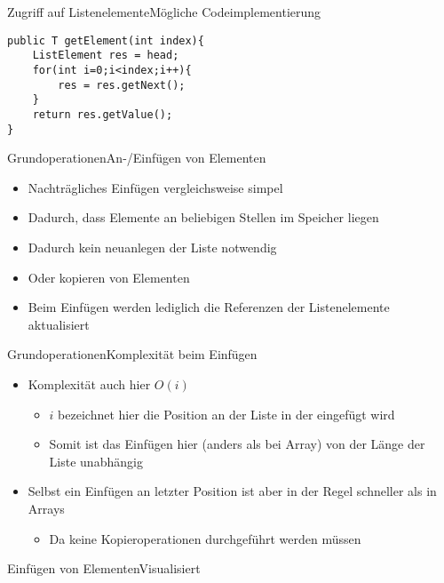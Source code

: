 \begin{frame}[fragile]{Zugriff auf Listenelemente}{Mögliche Codeimplementierung}
\lstset{style=java}
\begin{lstlisting}
public T getElement(int index){
	ListElement res = head;
	for(int i=0;i<index;i++){
		res = res.getNext();
	}
	return res.getValue();
}
\end{lstlisting}
\end{frame}

\begin{frame}{Grundoperationen}{An-/Einfügen von Elementen}
	\begin{itemize}
		\item Nachträgliches Einfügen vergleichsweise simpel
		\item Dadurch, dass Elemente an beliebigen Stellen im Speicher liegen
		\item Dadurch kein neuanlegen der Liste notwendig
		\item Oder kopieren von Elementen
		\item Beim Einfügen werden lediglich die Referenzen der Listenelemente aktualisiert
	\end{itemize}
\end{frame}

\begin{frame}{Grundoperationen}{Komplexität beim Einfügen}
	\begin{itemize}
		\item Komplexität auch hier $O(i)$
		\begin{itemize}
			\item $i$ bezeichnet hier die Position an der Liste in der eingefügt wird
			\item Somit ist das Einfügen hier (anders als bei Array) von der Länge der Liste unabhängig
		\end{itemize}
		\item Selbst ein Einfügen an letzter Position ist aber in der Regel schneller als in Arrays
		\begin{itemize}
			\item Da keine Kopieroperationen durchgeführt werden müssen
		\end{itemize}
	\end{itemize}
\end{frame}

\begin{frame}{Einfügen von Elementen}{Visualisiert}
\end{frame}

